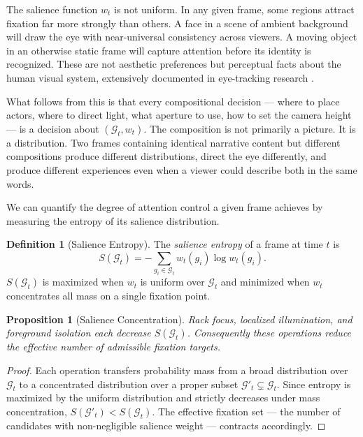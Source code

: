\documentclass[12pt, a4paper]{article}
\theoremstyle{plain}
\newtheorem{proposition}[theorem]{Proposition}
\theoremstyle{definition}
\newtheorem{definition}[theorem]{Definition}
\theoremstyle{remark}
\newcommand{\G}{\mathcal{G}}
\newcommand{\salience}{w}
\begin{document}
The salience function $\salience_t$ is not uniform. In any
given frame, some regions attract fixation far more strongly
than others. A face in a scene of ambient background will
draw the eye with near-universal consistency across viewers.
A moving object in an otherwise static frame will capture
attention before its identity is recognized. These are not
aesthetic preferences but perceptual facts about the human
visual system, extensively documented in eye-tracking
research \cite{yarbus1967,itti1998}.

What follows from this is that every compositional decision
--- where to place actors, where to direct light, what
aperture to use, how to set the camera height --- is a
decision about $(\G_t, \salience_t)$. The composition is
not primarily a picture. It is a distribution. Two frames
containing identical narrative content but different
compositions produce different distributions, direct the
eye differently, and produce different experiences even
when a viewer could describe both in the same words.

We can quantify the degree of attention control a given
frame achieves by measuring the entropy of its salience
distribution.

\begin{definition}[Salience Entropy]
  The \emph{salience entropy} of a frame at time $t$ is
  \begin{equation}
    S(\G_t)
    = -\sum_{g_i \in \G_t}
      \salience_t(g_i) \log \salience_t(g_i).
  \end{equation}
  $S(\G_t)$ is maximized when $\salience_t$ is uniform
  over $\G_t$ and minimized when $\salience_t$ concentrates
  all mass on a single fixation point.
\end{definition}

\begin{proposition}[Salience Concentration]
\label{prop:salience_concentration}
  Rack focus, localized illumination, and foreground
  isolation each decrease $S(\G_t)$. Consequently these
  operations reduce the effective number of admissible
  fixation targets.
\end{proposition}

\begin{proof}
  Each operation transfers probability mass from a broad
  distribution over $\G_t$ to a concentrated distribution
  over a proper subset $\G'_t \subsetneq \G_t$. Since
  entropy is maximized by the uniform distribution and
  strictly decreases under mass concentration,
  $S(\G'_t) < S(\G_t)$. The effective fixation set
  --- the number of candidates with non-negligible
  salience weight --- contracts accordingly.
\end{proof}
\end{document}
